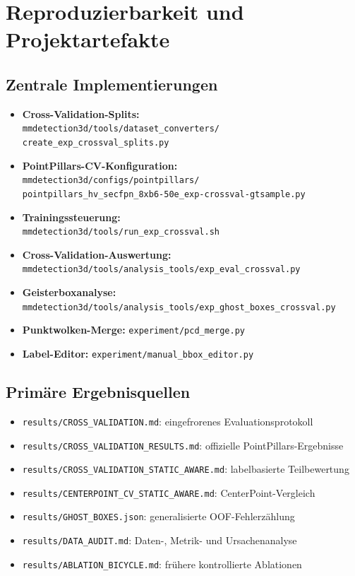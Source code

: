 \section{Reproduzierbarkeit und Projektartefakte}

\subsection{Zentrale Implementierungen}

\begin{itemize}
    \item \textbf{Cross-Validation-Splits:}\\ \texttt{mmdetection3d/tools/dataset\_converters/}\\\texttt{create\_exp\_crossval\_splits.py}
    \item \textbf{PointPillars-CV-Konfiguration:}\\ \texttt{mmdetection3d/configs/pointpillars/}\\\texttt{pointpillars\_hv\_secfpn\_8xb6-50e\_exp-crossval-gtsample.py}
    \item \textbf{Trainingssteuerung:}\\ \texttt{mmdetection3d/tools/run\_exp\_crossval.sh}
    \item \textbf{Cross-Validation-Auswertung:}\\ \texttt{mmdetection3d/tools/analysis\_tools/exp\_eval\_crossval.py}
    \item \textbf{Geisterboxanalyse:}\\ \texttt{mmdetection3d/tools/analysis\_tools/exp\_ghost\_boxes\_crossval.py}
    \item \textbf{Punktwolken-Merge:} \texttt{experiment/pcd\_merge.py}
    \item \textbf{Label-Editor:} \texttt{experiment/manual\_bbox\_editor.py}
\end{itemize}

\subsection{Primäre Ergebnisquellen}

\begin{itemize}\raggedright
    \item \texttt{results/CROSS\_VALIDATION.md}: eingefrorenes Evaluationsprotokoll
    \item \texttt{results/CROSS\_VALIDATION\_RESULTS.md}: offizielle PointPillars-Ergebnisse
    \item \texttt{results/CROSS\_VALIDATION\_STATIC\_AWARE.md}: labelbasierte Teilbewertung
    \item \texttt{results/CENTERPOINT\_CV\_STATIC\_AWARE.md}: CenterPoint-Vergleich
    \item \texttt{results/GHOST\_BOXES.json}: generalisierte OOF-Fehlerzählung
    \item \texttt{results/DATA\_AUDIT.md}: Daten-, Metrik- und Ursachenanalyse
    \item \texttt{results/ABLATION\_BICYCLE.md}: frühere kontrollierte Ablationen
\end{itemize}

